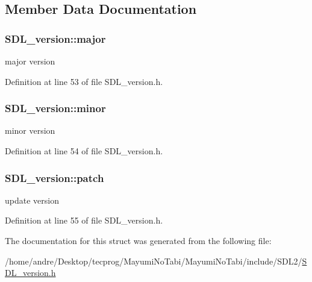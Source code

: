 \subsection{Member Data Documentation}
\hypertarget{struct_s_d_l__version_ad7d7674532073eed237b90f546c97cd0}{
\subsubsection[{major}]{ S\-D\-L\-\_\-version\-::major}}\label{struct_s_d_l__version_ad7d7674532073eed237b90f546c97cd0}
major version 

Definition at line 53 of file S\-D\-L\-\_\-version.\-h.

\hypertarget{struct_s_d_l__version_a6c35c7bf80245028d5970e6a504ecf57}{
\subsubsection[{minor}]{ S\-D\-L\-\_\-version\-::minor}}\label{struct_s_d_l__version_a6c35c7bf80245028d5970e6a504ecf57}
minor version 

Definition at line 54 of file S\-D\-L\-\_\-version.\-h.

\hypertarget{struct_s_d_l__version_aa6dacff18edee8cd037c773b843be0f1}{
\subsubsection[{patch}]{ S\-D\-L\-\_\-version\-::patch}}\label{struct_s_d_l__version_aa6dacff18edee8cd037c773b843be0f1}
update version 

Definition at line 55 of file S\-D\-L\-\_\-version.\-h.



The documentation for this struct was generated from the following file\-:\begin{DoxyCompactItemize}
\item 
/home/andre/\-Desktop/tecprog/\-Mayumi\-No\-Tabi/\-Mayumi\-No\-Tabi/include/\-S\-D\-L2/\hyperlink{_s_d_l__version_8h}{S\-D\-L\-\_\-version.\-h}\end{DoxyCompactItemize}
